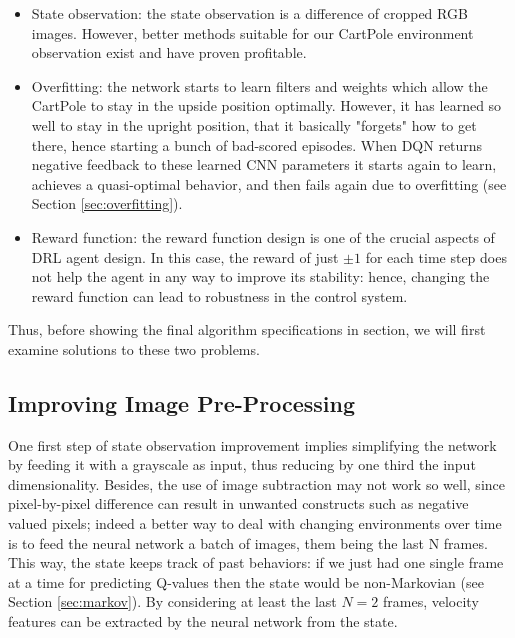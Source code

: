 \begin{itemize}
	
		
	\item State observation: the state observation is a difference of cropped RGB images. However, better methods suitable for our CartPole environment observation exist and have proven profitable. 
	
	\item Overfitting: the network starts to learn filters and weights which allow the CartPole to stay in the upside position optimally. However, it has learned so well to stay in the upright position, that it basically "forgets" how to get there, hence starting a bunch of bad-scored episodes. When DQN returns negative feedback to these learned CNN parameters it starts again to learn, achieves a quasi-optimal behavior, and then fails again due to overfitting (see Section \ref{sec:overfitting}).
	
	\item Reward function: the reward function design is one of the crucial aspects of DRL agent design. In this case, the reward of just $\pm 1$ for each time step does not help the agent in any way to improve its stability: hence, changing the reward function can lead to robustness in the control system.

\end{itemize}

Thus, before showing the final algorithm specifications in section, we will first examine solutions to these two problems.

\subsection{Improving Image Pre-Processing}

One first step of state observation improvement implies simplifying the network by feeding it with a grayscale as input, thus reducing by one third the input dimensionality. Besides, the use of image subtraction may not work so well, since pixel-by-pixel difference can result in unwanted constructs such as negative valued pixels; indeed a better way to deal with changing environments over time is to feed the neural network a batch of images, them being the last N frames. This way, the state keeps track of past behaviors: if we just had one single frame at a time for predicting Q-values then the state would be non-Markovian (see Section \ref{sec:markov}). By considering at least the last $N=2$ frames, velocity features can be extracted by the neural network from the state.


